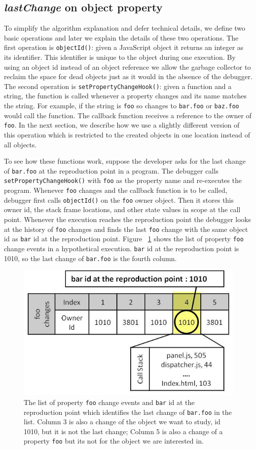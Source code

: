 \documentclass[runningheads,a4paper]{llncs}
\begin{document}
\subsection{\textit{lastChange} on object property}
To simplify the algorithm explanation and defer technical details, we
define two basic operations and later we explain the details of these
two operations. The first operation is \texttt{objectId()}: given a
JavaScript object it returns an integer as its identifier. This
identifier is unique to the object during one execution.  By using an
object id instead of an object reference we allow the garbage
collector to reclaim the space for dead objects just as it would in the
absence of the debugger. The second
operation is \texttt{setPropertyChangeHook()}: given a function and a
string, the function is called whenever a property changes and its
name matches the string. For example, if the string is 
\texttt{foo} so changes to \texttt{bar.foo} or \texttt{baz.foo} would
call the function.  The callback function receives a reference to the
owner of \texttt{foo}. In the next section, we describe how we use
a slightly different version of this operation which is restricted 
to the created objects in one location instead of all objects.

To see how these functions work, suppose the developer asks for the
last change of \texttt{bar.foo} at the reproduction point in a
program. The debugger calls \texttt{setPropertyChangeHook()} with
\texttt{foo} as the property name and re-executes the
program. Whenever \texttt{foo} changes and the callback function is to
be called, debugger first calls \texttt{objectId()} on the
\texttt{foo} owner object. Then it stores this owner id, the stack
frame locations, and other state values in scope at the call point.
Whenever the execution reaches the reproduction point the debugger
looks at the history of \texttt{foo} changes and finds the last
\texttt{foo} change with the same object id as \texttt{bar} id at the
reproduction point. Figure ~\ref{fig:foo-changes1} shows the list of
property \texttt{foo} change events in a hypothetical
execution. \texttt{bar} id at the reproduction point is 1010, so the
last change of \texttt{bar.foo} is the fourth column. 

\begin{figure}[htp]
\includegraphics[width=.48\textwidth]{6-foo-changes1.jpg}
\caption{The list of property \texttt{foo} change events and
  \texttt{bar} id at the reproduction point which identifies the last
  change of \texttt{bar.foo} in the list. Column 3 is also a change of
  the object we want to study, id 1010, but it is not the last change;
  Column 5 is also a change of a property \texttt{foo} but its not for
  the object we are interested in.}
\label{fig:foo-changes1}
\end{figure}
\end{document}

